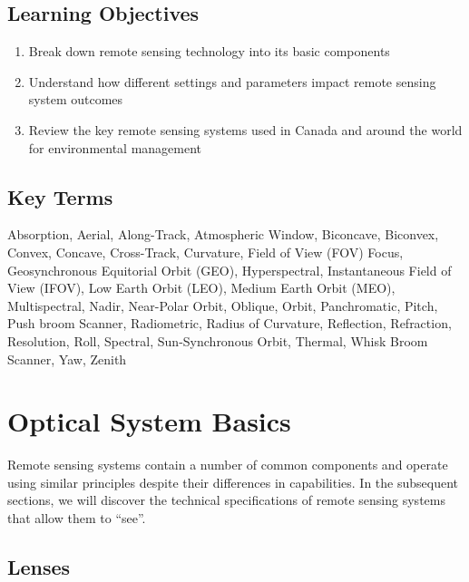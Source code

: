 \documentclass[
]{book}
\providecommand{\tightlist}{%
  \setlength{\itemsep}{0pt}\setlength{\parskip}{0pt}}
\begin{document}
\hypertarget{learning-objectives-11}{%
\subsection*{Learning Objectives}\label{learning-objectives-11}}

\begin{enumerate}
\def\labelenumi{\arabic{enumi}.}
\tightlist
\item
  Break down remote sensing technology into its basic components
\item
  Understand how different settings and parameters impact remote sensing system outcomes
\item
  Review the key remote sensing systems used in Canada and around the world for environmental management
\end{enumerate}

\hypertarget{key-terms-11}{%
\subsection*{Key Terms}\label{key-terms-11}}

Absorption, Aerial, Along-Track, Atmospheric Window, Biconcave, Biconvex, Convex, Concave, Cross-Track, Curvature, Field of View (FOV) Focus, Geosynchronous Equitorial Orbit (GEO), Hyperspectral, Instantaneous Field of View (IFOV), Low Earth Orbit (LEO), Medium Earth Orbit (MEO), Multispectral, Nadir, Near-Polar Orbit, Oblique, Orbit, Panchromatic, Pitch, Push broom Scanner, Radiometric, Radius of Curvature, Reflection, Refraction, Resolution, Roll, Spectral, Sun-Synchronous Orbit, Thermal, Whisk Broom Scanner, Yaw, Zenith

\hypertarget{optical-system-basics}{%
\section{Optical System Basics}\label{optical-system-basics}}

Remote sensing systems contain a number of common components and operate using similar principles despite their differences in capabilities. In the subsequent sections, we will discover the technical specifications of remote sensing systems that allow them to ``see''.

\hypertarget{lenses}{%
\subsection{Lenses}\label{lenses}}
\end{document}
